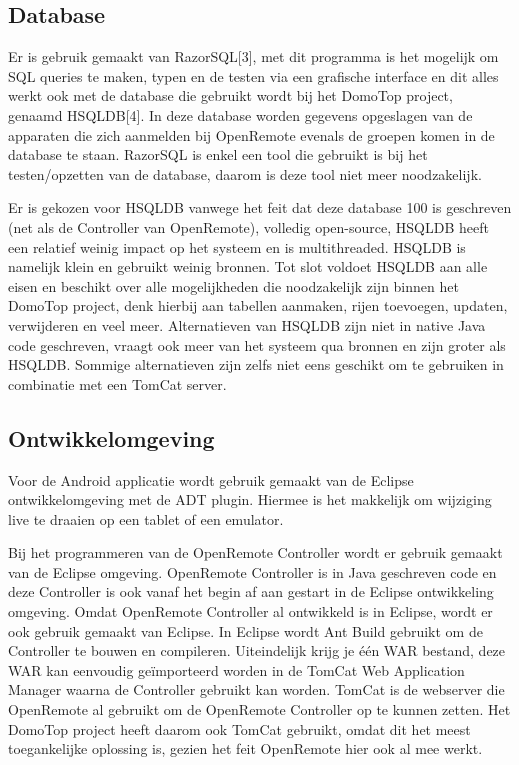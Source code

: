 \documentclass[]{article}
\begin{document}
\subsection{Database}
Er is gebruik gemaakt van RazorSQL[3], met dit programma is het mogelijk om
SQL queries te maken, typen en de testen via een grafische interface en dit
alles werkt ook met de database die gebruikt wordt bij het DomoTop project,
genaamd HSQLDB[4]. In deze database worden gegevens opgeslagen van de
apparaten die zich aanmelden bij OpenRemote evenals de groepen komen in de
database te staan.  RazorSQL is enkel een tool die gebruikt is bij het
testen/opzetten van de database, daarom is deze tool niet meer
noodzakelijk.

Er is gekozen voor HSQLDB vanwege het feit dat deze database 100%
is geschreven (net als de Controller van OpenRemote), volledig open-source,
HSQLDB heeft een relatief weinig impact op het systeem en is multithreaded.
HSQLDB is namelijk klein en gebruikt weinig bronnen. Tot slot voldoet
HSQLDB aan alle eisen en beschikt over alle mogelijkheden die noodzakelijk
zijn binnen het DomoTop project, denk hierbij aan tabellen aanmaken, rijen
toevoegen, updaten, verwijderen en veel meer. Alternatieven van HSQLDB zijn
niet in native Java code geschreven,  vraagt ook meer van het systeem qua
bronnen en zijn groter als HSQLDB. Sommige alternatieven zijn zelfs niet
eens geschikt om te gebruiken in combinatie met een TomCat server.

\subsection{Ontwikkelomgeving}
Voor de Android applicatie wordt gebruik gemaakt van de Eclipse
ontwikkelomgeving met de ADT plugin. Hiermee is het makkelijk om wijziging
live te draaien op een tablet of een emulator.

Bij het programmeren van de OpenRemote Controller wordt er gebruik gemaakt
van de Eclipse omgeving. OpenRemote Controller is in Java geschreven code
en deze Controller is ook vanaf het begin af aan gestart in de Eclipse
ontwikkeling omgeving. Omdat OpenRemote Controller al ontwikkeld is in
Eclipse, wordt er ook gebruik gemaakt van Eclipse. In Eclipse wordt Ant
Build gebruikt om de Controller te bouwen en compileren. Uiteindelijk krijg
je één WAR bestand, deze WAR kan eenvoudig geïmporteerd worden in de TomCat
Web Application Manager waarna de Controller gebruikt kan worden. TomCat is
de webserver die OpenRemote al gebruikt om de OpenRemote Controller op te
kunnen zetten. Het DomoTop project heeft daarom ook TomCat gebruikt, omdat
dit het meest toegankelijke oplossing is, gezien het feit OpenRemote hier
ook al mee werkt.
\end{document}

